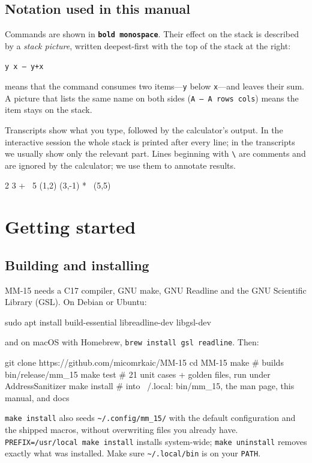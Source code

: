 \documentclass[11pt,letterpaper]{article}
\newcommand{\code}[1]{\texttt{#1}}
\newcommand{\cmd}[1]{\texttt{\textbf{#1}}}
\newcommand{\stk}[1]{\texttt{#1}}
\begin{document}
\subsection{Notation used in this manual}

Commands are shown in \cmd{bold monospace}. Their effect on the stack is described by a \emph{stack picture}, written deepest-first with the top of the stack at the right:
\begin{center}\stk{y x -- y+x}\end{center}
means that the command consumes two items---\code{y} below \code{x}---and leaves their sum. A picture that lists the same name on both sides (\stk{A -- A rows cols}) means the item stays on the stack.

Transcripts show what you type, followed by the calculator's output. In the interactive session the whole stack is printed after every line; in the transcripts we usually show only the relevant part. Lines beginning with \code{\textbackslash} are comments and are ignored by the calculator; we use them to annotate results.

\begin{rpn}
2 3 +            \ 5
(1,2) (3,-1) *   \ (5,5)
\end{rpn}

\section{Getting started}

\subsection{Building and installing}

MM-15 needs a C17 compiler, GNU make, GNU Readline and the GNU Scientific Library (GSL). On Debian or Ubuntu:
\begin{shell}
sudo apt install build-essential libreadline-dev libgsl-dev
\end{shell}
and on macOS with Homebrew, \code{brew install gsl readline}. Then:
\begin{shell}
git clone https://github.com/micomrkaic/MM-15
cd MM-15
make              # builds bin/release/mm_15
make test         # 21 unit cases + golden files, run under AddressSanitizer
make install      # into ~/.local: bin/mm_15, the man page, this manual, and docs
\end{shell}
\code{make install} also seeds \code{\textasciitilde/.config/mm\_15/} with the default configuration and the shipped macros, without overwriting files you already have. \code{PREFIX=/usr/local make install} installs system-wide; \code{make uninstall} removes exactly what was installed. Make sure \code{\textasciitilde/.local/bin} is on your \code{PATH}.
\end{document}
